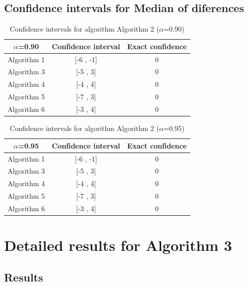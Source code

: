 \documentclass[a4paper,10pt]{article}
\begin{document}
\subsection{Confidence intervals for Median of diferences}

\begin{table}[!htp]
\centering\small
\begin{tabular}{
|c|c|c|}
\hline
 $\alpha$=0.90 & Confidence interval & Exact confidence \\ \hline 
Algorithm 1 & [-6 , -1] & 0\\ \hline 
Algorithm 3 & [-5 , 3] & 0\\ \hline 
Algorithm 4 & [-4 , 4] & 0\\ \hline 
Algorithm 5 & [-7 , 3] & 0\\ \hline 
Algorithm 6 & [-3 , 4] & 0\\ \hline 

\end{tabular}
\caption{Confidence intervals for algorithm Algorithm 2 ($\alpha$=0.90)}
\end{table}
\begin{table}[!htp]
\centering\small
\begin{tabular}{
|c|c|c|}
\hline
 $\alpha$=0.95 & Confidence interval & Exact confidence \\ \hline 
Algorithm 1 & [-6 , -1] & 0\\ \hline 
Algorithm 3 & [-5 , 3] & 0\\ \hline 
Algorithm 4 & [-4 , 4] & 0\\ \hline 
Algorithm 5 & [-7 , 3] & 0\\ \hline 
Algorithm 6 & [-3 , 4] & 0\\ \hline 

\end{tabular}
\caption{Confidence intervals for algorithm Algorithm 2 ($\alpha$=0.95)}
\end{table}

 \clearpage 


\section{Detailed results for Algorithm 3}


\subsection{Results}
\end{document}
